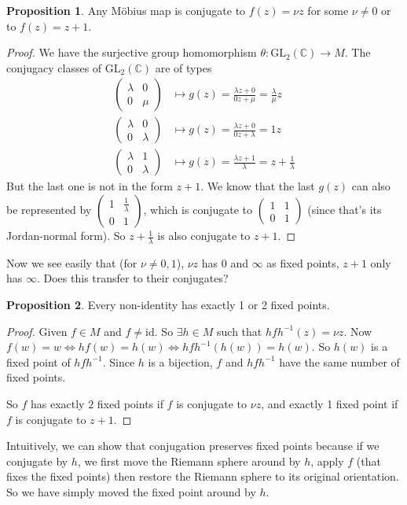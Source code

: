 \documentclass[a4paper]{article}
\theoremstyle{definition}
\newtheorem*{prop}{Proposition}
\newcommand{\C}{\mathbb{C}}
\newcommand{\GL}{\mathrm{GL}}
\begin{document}
\begin{prop}
Any M\"obius map is conjugate to $f(z) = \nu z$ for some $\nu\not= 0$ or to $f(z) = z + 1$.
\end{prop}

\begin{proof}
  We have the surjective group homomorphism $\theta: \GL_2(\C) \to M$. The conjugacy classes of $\GL_2(\C)$ are of types
  \begin{align*}
      \begin{pmatrix}
    \lambda & 0\\
    0 & \mu
  \end{pmatrix} &\mapsto g(z) = \frac{\lambda z + 0}{0z + \mu} = \frac{\lambda}{\mu}z\\
  \begin{pmatrix}
    \lambda & 0\\
    0 & \lambda
  \end{pmatrix} &\mapsto g(z) = \frac{\lambda z + 0}{0z + \lambda} = 1 z\\
  \begin{pmatrix}
    \lambda & 1\\
    0 & \lambda
  \end{pmatrix} &\mapsto g(z) = \frac{\lambda z + 1}{\lambda} = z + \frac{1}{\lambda}
  \end{align*}
  But the last one is not in the form $z + 1$. We know that the last $g(z)$ can also be represented by $
  \begin{pmatrix}
    1 & \frac{1}{\lambda}\\
    0 & 1
  \end{pmatrix}$, which is conjugate to $
  \begin{pmatrix}
    1 & 1\\
    0 & 1
  \end{pmatrix}$ (since that's its Jordan-normal form). So $z + \frac{1}{\lambda}$ is also conjugate to $z + 1$.
\end{proof}

Now we see easily that (for $\nu \not= 0, 1$), $\nu z$ has $0$ and $\infty$ as fixed points, $z + 1$ only has $\infty$. Does this transfer to their conjugates?

\begin{prop}
  Every non-identity has exactly 1 or 2 fixed points. 
\end{prop}

\begin{proof}
  Given $f\in M$ and $f\not= \mathrm{id}$. So $\exists h\in M$ such that $hfh^{-1}(z) = \nu{z}$. Now $f(w) = w \Leftrightarrow hf(w) = h(w) \Leftrightarrow hfh^{-1}(h(w)) = h(w)$. So $h(w)$ is a fixed point of $hfh^{-1}$. Since $h$ is a bijection, $f$ and $hfh^{-1}$ have the same number of fixed points.

  So $f$ has exactly $2$ fixed points if $f$ is conjugate to $\nu z$, and exactly 1 fixed point if $f$ is conjugate to $z + 1$.
\end{proof}
Intuitively, we can show that conjugation preserves fixed points because if we conjugate by $h$, we first move the Riemann sphere around by $h$, apply $f$ (that fixes the fixed points) then restore the Riemann sphere to its original orientation. So we have simply moved the fixed point around by $h$.
\end{document}
